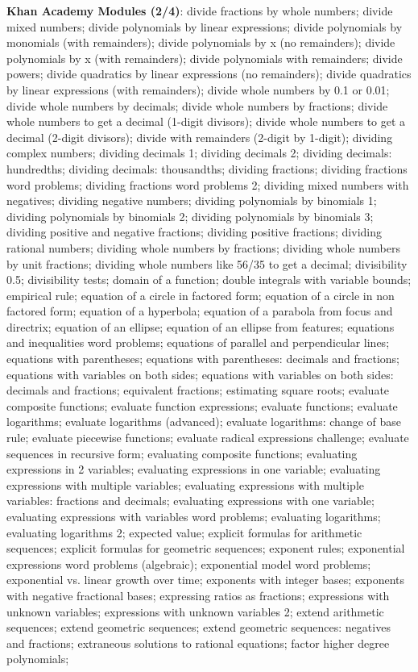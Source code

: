 \documentclass{article}
\begin{document}
\begin{figure*}
\textbf{Khan Academy Modules (2/4)}: divide fractions by whole numbers; divide mixed numbers; divide polynomials by linear expressions; divide polynomials by monomials (with remainders); divide polynomials by x (no remainders); divide polynomials by x (with remainders); divide polynomials with remainders; divide powers; divide quadratics by linear expressions (no remainders); divide quadratics by linear expressions (with remainders); divide whole numbers by 0.1 or 0.01; divide whole numbers by decimals; divide whole numbers by fractions; divide whole numbers to get a decimal (1-digit divisors); divide whole numbers to get a decimal (2-digit divisors); divide with remainders (2-digit by 1-digit); dividing complex numbers; dividing decimals 1; dividing decimals 2; dividing decimals: hundredths; dividing decimals: thousandths; dividing fractions; dividing fractions word problems; dividing fractions word problems 2; dividing mixed numbers with negatives; dividing negative numbers; dividing polynomials by binomials 1; dividing polynomials by binomials 2; dividing polynomials by binomials 3; dividing positive and negative fractions; dividing positive fractions; dividing rational numbers; dividing whole numbers by fractions; dividing whole numbers by unit fractions; dividing whole numbers like 56/35 to get a decimal; divisibility 0.5; divisibility tests; domain of a function; double integrals with variable bounds; empirical rule; equation of a circle in factored form; equation of a circle in non factored form; equation of a hyperbola; equation of a parabola from focus and directrix; equation of an ellipse; equation of an ellipse from features; equations and inequalities word problems; equations of parallel and perpendicular lines; equations with parentheses; equations with parentheses: decimals and fractions; equations with variables on both sides; equations with variables on both sides: decimals and fractions; equivalent fractions; estimating square roots; evaluate composite functions; evaluate function expressions; evaluate functions; evaluate logarithms; evaluate logarithms (advanced); evaluate logarithms: change of base rule; evaluate piecewise functions; evaluate radical expressions challenge; evaluate sequences in recursive form; evaluating composite functions; evaluating expressions in 2 variables; evaluating expressions in one variable; evaluating expressions with multiple variables; evaluating expressions with multiple variables: fractions and decimals; evaluating expressions with one variable; evaluating expressions with variables word problems; evaluating logarithms; evaluating logarithms 2; expected value; explicit formulas for arithmetic sequences; explicit formulas for geometric sequences; exponent rules; exponential expressions word problems (algebraic); exponential model word problems; exponential vs. linear growth over time; exponents with integer bases; exponents with negative fractional bases; expressing ratios as fractions; expressions with unknown variables; expressions with unknown variables 2; extend arithmetic sequences; extend geometric sequences; extend geometric sequences: negatives and fractions; extraneous solutions to rational equations; factor higher degree polynomials; 
\end{figure*}
\end{document}
